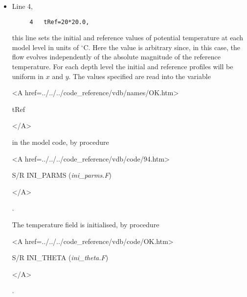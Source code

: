 \begin{itemize}

\item Line 4, 
\begin{verbatim}
     4	 tRef=20*20.0,
\end{verbatim}
this line sets
the initial and reference values of potential temperature at each model
level in units of $^{\circ}$C. Here the value is arbitrary since, in this case, the 
flow evolves independently of the absolute magnitude of the reference temperature.
For each depth level the initial and reference profiles will be uniform in
$x$ and $y$. The values specified are read into the
variable 
{\bf 
\begin{rawhtml} <A href=../../../code_reference/vdb/names/OK.htm> \end{rawhtml}
tRef
\begin{rawhtml} </A>\end{rawhtml}
} 
in the model code, by procedure 
{\it
\begin{rawhtml} <A href=../../../code_reference/vdb/code/94.htm> \end{rawhtml}
S/R INI\_PARMS ({\it ini\_parms.F})
\begin{rawhtml} </A>\end{rawhtml}.
}
The temperature field is initialised, by procedure 
{\it
\begin{rawhtml} <A href=../../../code_reference/vdb/code/OK.htm> \end{rawhtml}
S/R INI\_THETA ({\it ini\_theta.F})
\begin{rawhtml} </A>\end{rawhtml}.
}



\end{itemize}
